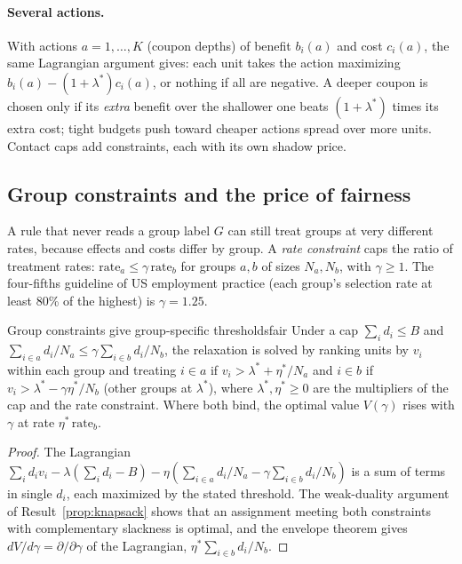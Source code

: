 \documentclass[11pt]{article}
\begin{document}
\paragraph{Several actions.} With actions $a = 1, \dots, K$ (coupon depths) of benefit $b_i(a)$ and cost $c_i(a)$, the same
Lagrangian argument gives: each unit takes the action maximizing $b_i(a) - (1 + \lambda^\ast)c_i(a)$, or nothing if all are
negative. A deeper coupon is chosen only if its \emph{extra} benefit over the shallower one beats $(1+\lambda^\ast)$ times its
extra cost; tight budgets push toward cheaper actions spread over more units. Contact caps add constraints, each with its
own shadow price.

\subsection{Group constraints and the price of fairness}

A rule that never reads a group label $G$ can still treat groups at very different rates, because effects and costs
differ by group. A \emph{rate constraint} caps the ratio of treatment rates: $\text{rate}_a \le \gamma\,\text{rate}_b$ for
groups $a, b$ of sizes $N_a, N_b$, with $\gamma \ge 1$. The four-fifths guideline of US employment practice (each group's
selection rate at least 80\% of the highest) is $\gamma = 1.25$.

\begin{prop}{Group constraints give group-specific thresholds}{fair}
Under a cap $\sum_i d_i \le B$ and $\sum_{i \in a} d_i/N_a \le \gamma\sum_{i \in b} d_i/N_b$, the relaxation is solved by ranking
units by $v_i$ within each group and treating $i \in a$ if $v_i > \lambda^\ast + \eta^\ast/N_a$ and $i \in b$ if
$v_i > \lambda^\ast - \gamma\eta^\ast/N_b$ (other groups at $\lambda^\ast$), where $\lambda^\ast, \eta^\ast \ge 0$ are the multipliers of
the cap and the rate constraint. Where both bind, the optimal value $V(\gamma)$ rises with $\gamma$ at rate
$\eta^\ast\,\text{rate}_b$.
\end{prop}
\begin{proof}
The Lagrangian $\sum_i d_iv_i - \lambda(\sum_i d_i - B) - \eta(\sum_{i \in a} d_i/N_a - \gamma\sum_{i \in b} d_i/N_b)$ is a sum of
terms in single $d_i$, each maximized by the stated threshold. The weak-duality argument of Result~\ref{prop:knapsack} shows
that an assignment meeting both constraints with complementary slackness is optimal, and the envelope theorem gives
$dV/d\gamma = \partial/\partial\gamma$ of the Lagrangian, $\eta^\ast\sum_{i \in b} d_i/N_b$.
\end{proof}
\end{document}
